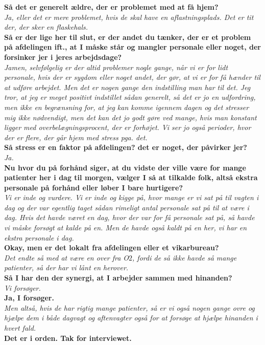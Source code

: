 \noindent
\textbf{Så det er generelt ældre, der er problemet med at få hjem?} \\
\noindent
\textit{Ja, eller det er mere problemet, hvis de skal have en aflastningsplads. Det er tit der, der sker en flaskehals.}  \\
\noindent
\textbf{Så er der lige her til slut, er der andet du tænker, der er et problem på afdelingen ift., at I måske står og mangler personale eller noget, der forsinker jer i jeres arbejdsdage?} \\
\noindent
\textit{Jamen, selvfølgelig er der altid problemer nogle gange, når vi er for lidt personale, hvis der er sygdom eller noget andet, der gør, at vi er for få hænder til at udføre arbejdet. Men det er nogen gange den indstilling man har til det. Jeg tror, at jeg er meget positivt indstillet sådan generelt, så det er jo en udfordring, men ikke en begrænsning for, at jeg kan komme igennem dagen og det stresser mig ikke nødvendigt, men det kan det jo godt gøre ved mange, hvis man konstant ligger med overbelægningsprocent, der er forhøjet. Vi ser jo også perioder, hvor der er flere, der går hjem med stress pga. det. } \\ 
\noindent
\textbf{Så stress er en faktor på afdelingen? det er noget, der påvirker jer?} \\
\noindent
\textit{ Ja.} \\
\noindent
\textbf{Nu hvor du på forhånd siger, at du vidste der ville være for mange patienter her i dag til morgen, vælger I så at tilkalde folk, altså ekstra personale på forhånd eller løber I bare hurtigere? } \\
\noindent
\textit{Vi er inde og vurdere. Vi er inde og kigge på, hvor mange er vi sat på til vagten i dag og der var egentlig taget sådan rimeligt antal personale sat på til at være i dag.
Hvis det havde været en dag, hvor der var for få personale sat på, så havde vi måske forsøgt at kalde på en. Men de havde også kaldt på en her, vi har en ekstra personale i dag.} \\
\noindent
\textbf{Okay, men er det lokalt fra afdelingen eller et vikarbureau? } \\
\noindent
\textit{ Det endte så med at være en over fra O$2$, fordi de så ikke havde så mange patienter, så der har vi lånt en herover.} \\
\noindent
\textbf{Så I har den der synergi, at I arbejder sammen med hinanden?} \\
\noindent
\textit{Vi forsøger.} \\
\noindent
\textbf{Ja, I forsøger.} \\
\noindent
\textit{Men altså, hvis de har rigtig mange patienter, så er vi også nogen gange ovre og hjælpe dem i både dagvagt og aftenvagter også for at forsøge at hjælpe hinanden i hvert fald.} \\
\noindent
\textbf{Det er i orden. Tak for interviewet.} \\

